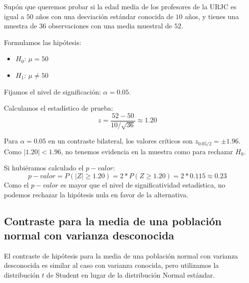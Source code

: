 \documentclass[
  letterpaper,
  DIV=11,
  numbers=noendperiod]{scrreprt}
\providecommand{\tightlist}{%
  \setlength{\itemsep}{0pt}\setlength{\parskip}{0pt}}\usepackage{longtable,booktabs,array}
\begin{document}
\begin{tcolorbox}[enhanced jigsaw, arc=.35mm, breakable, coltitle=black, left=2mm, opacityback=0, bottomtitle=1mm, colbacktitle=quarto-callout-tip-color!10!white, title=\textcolor{quarto-callout-tip-color}{\faLightbulb}\hspace{0.5em}{Ejemplo Práctico. Contraste de hipótesis media normal, varianza conocida}, titlerule=0mm, colback=white, colframe=quarto-callout-tip-color-frame, bottomrule=.15mm, rightrule=.15mm, opacitybacktitle=0.6, toptitle=1mm, toprule=.15mm, leftrule=.75mm]

Supón que queremos probar si la edad media de los profesores de la URJC
es igual a \(50\) años con una desviación estándar conocida de \(10\)
años, y tienes una muestra de \(36\) observaciones con una media
muestral de \(52\).

Formulamos las hipótesis:

\begin{itemize}
\tightlist
\item
  \(H_0\): \(\mu = 50\)
\item
  \(H_1\): \(\mu \neq 50\)
\end{itemize}

Fijamos el nivel de significación: \(\alpha = 0.05\).

Calculamos el estadístico de prueba:
\[ z = \frac{52 - 50}{10/\sqrt{36}}  \approx 1.20 \]

Para \(\alpha = 0.05\) en un contraste bilateral, los valores críticos
son \(z_{0.05/2}=\pm 1.96\). Como \(|1.20| < 1.96\), no tenemos
evidencia en la muestra como para rechazar \(H_0\).

Si hubiéramos calculado el \(p-valor\):
\[p-valor=P(|Z| \geq 1.20)=2*P(Z \geq 1.20)=2*0.115\approx0.23\] Como el
\(p-valor\) es mayor que el nivel de significatividad estadística, no
podemos rechazar la hipótesis nula en favor de la alternativa.

\end{tcolorbox}

\hypertarget{contraste-para-la-media-de-una-poblaciuxf3n-normal-con-varianza-desconocida}{%
\subsection{Contraste para la media de una población normal con varianza
desconocida}\label{contraste-para-la-media-de-una-poblaciuxf3n-normal-con-varianza-desconocida}}

El contraste de hipótesis para la media de una población normal con
varianza desconocida es similar al caso con varianza conocida, pero
utilizamos la distribución \(t\) de Student en lugar de la distribución
Normal estándar.
\end{document}
